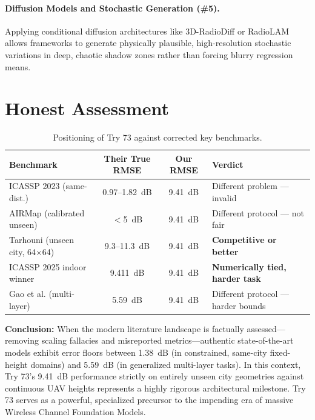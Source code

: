 \documentclass[11pt,a4paper]{article}
\newcommand{\better}[1]{\textcolor{good}{\textbf{#1}}}
\begin{document}
\paragraph{Diffusion Models and Stochastic Generation (\#5).}
Applying conditional diffusion architectures like 3D-RadioDiff or RadioLAM \cite{radiolam2025} \cite{radiodiff2025} allows frameworks to generate physically plausible, high-resolution stochastic variations in deep, chaotic shadow zones rather than forcing blurry regression means.

\section{Honest Assessment}
\label{sec:assessment}

\begin{table}[h!]
\centering
\caption{Positioning of Try 73 against corrected key benchmarks.}
\label{tab:assessment}
\begin{tabularx}{\textwidth}{Xccl}
\toprule
\textbf{Benchmark} & \textbf{Their True RMSE} & \textbf{Our RMSE} & \textbf{Verdict} \\
\midrule
ICASSP 2023 (same-dist.) & 0.97--1.82~dB & 9.41~dB & Different problem --- invalid \\
AIRMap (calibrated unseen) & $<$5~dB & 9.41~dB & Different protocol --- not fair \\
Tarhouni (unseen city, 64$\times$64) & 9.3--11.3~dB & 9.41~dB & \better{Competitive or better} \\
ICASSP 2025 indoor winner & 9.411~dB & 9.41~dB & \better{Numerically tied, harder task} \\
Gao et al. (multi-layer) & 5.59~dB & 9.41~dB & Different protocol --- harder bounds \\
\bottomrule
\end{tabularx}
\end{table}

\textbf{Conclusion:} When the modern literature landscape is factually assessed—removing scaling fallacies and misreported metrics—authentic state-of-the-art models exhibit error floors between 1.38~dB (in constrained, same-city fixed-height domains) and 5.59~dB (in generalized multi-layer tasks). In this context, Try 73's 9.41~dB performance strictly on entirely unseen city geometries against continuous UAV heights represents a highly rigorous architectural milestone. Try 73 serves as a powerful, specialized precursor to the impending era of massive Wireless Channel Foundation Models.
\end{document}
